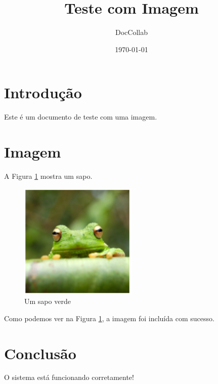 \documentclass[12pt,a4paper]{article}
\title{Teste com Imagem}
\author{DocCollab}
\date{\today}
\begin{document}
\maketitle

\section{Introdução}

Este é um documento de teste com uma imagem.

\section{Imagem}

A Figura \ref{fig:frog} mostra um sapo.

\begin{figure}[h]
  \centering
  \includegraphics[width=0.5\textwidth]{imagens/frog.png}
  \caption{Um sapo verde}
  \label{fig:frog}
\end{figure}

Como podemos ver na Figura \ref{fig:frog}, a imagem foi incluída com sucesso.

\section{Conclusão}

O sistema está funcionando corretamente!
\end{document}
